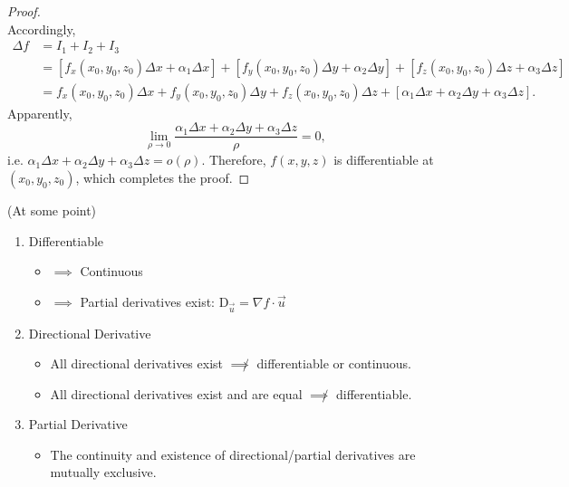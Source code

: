 \documentclass[11pt]{../../TexTemplate/elegantbook}
\begin{document}
\begin{proof}
\[    \]
    Accordingly, 
    \begin{align*}
        \Delta f &= I_{1} + I_{2} + I_{3} \\
        &= \left[ f_{x}(x_{0},y_{0},z_{0})\Delta x + \alpha_{1}\Delta x \right] + \left[ f_{y}(x_{0},y_{0},z_{0})\Delta y + \alpha_{2}\Delta y \right] + \left[ f_{z}(x_{0},y_{0},z_{0})\Delta z + \alpha_{3}\Delta z \right] \\
        &= f_{x}(x_{0},y_{0},z_{0})\Delta x + f_{y}(x_{0},y_{0},z_{0})\Delta y + f_{z}(x_{0},y_{0},z_{0})\Delta z + \left[ \alpha_{1}\Delta x + \alpha_{2}\Delta y + \alpha_{3}\Delta z \right].
    \end{align*}
    Apparently, 
    \[
        \lim_{\rho \to 0} \frac{\alpha_{1}\Delta x + \alpha_{2}\Delta y + \alpha_{3}\Delta z}{\rho} = 0,
    \]
    i.e. \(\alpha_{1}\Delta x + \alpha_{2}\Delta y + \alpha_{3}\Delta z = o(\rho)\). 
    Therefore, \(f(x,y,z)\) is differentiable at \((x_{0},y_{0},z_{0})\), which completes the proof.
\end{proof}

\begin{note}{(At some point)}
    \begin{enumerate}
        \item  Differentiable
            \begin{itemize}
                \item \(\implies\) Continuous
                \item \(\implies\) Partial derivatives exist: \(\mathrm{D}_{\vec{u}}=\nabla f\cdot\vec{u}\)
            \end{itemize}
        \item  Directional Derivative
            \begin{itemize}
                \item All directional derivatives exist \(\not\implies\) differentiable or continuous.
                \item All directional derivatives exist and are equal \(\not\implies\) differentiable.
            \end{itemize}
        \item  Partial Derivative
        \begin{itemize}
            \item  The continuity and existence of directional/partial derivatives are mutually exclusive.
        \end{itemize}
    \end{enumerate}
\end{note}
\end{document}

